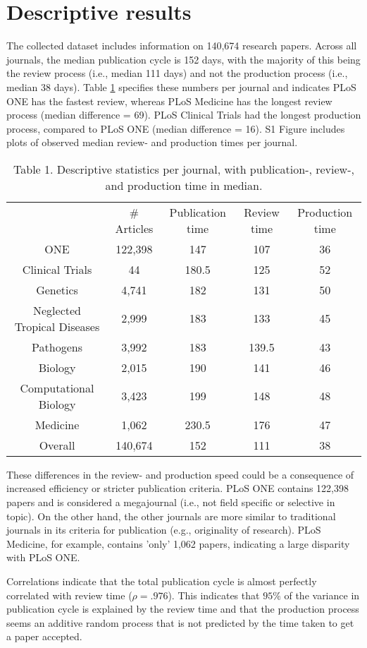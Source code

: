 \section*{Descriptive results}
The collected dataset includes information on 140,674 research papers. Across all journals, the median publication cycle is 152 days, with the majority of this being the review process (i.e., median 111 days) and not the production process (i.e., median 38 days). Table \ref{tab:tab1} specifies these numbers per journal and indicates PLoS ONE has the fastest review, whereas PLoS Medicine has the longest review process (median difference = 69). PLoS Clinical Trials had the longest production process, compared to PLoS ONE (median difference = 16). S1 Figure includes plots of observed median review- and production times per journal. 

\begin{table}
\caption{Table 1. Descriptive statistics per journal, with publication-, review-, and production time in median.}
\label{tab:tab1}
\begin{tabular}{ c c c c c }
          & \# Articles & Publication time & Review time & Production time \\
    ONE   & 122,398 & 147   & 107   & 36 \\
    Clinical Trials & 44    & 180.5 & 125   & 52 \\
    Genetics & 4,741  & 182   & 131   & 50 \\
    Neglected Tropical Diseases & 2,999  & 183   & 133   & 45 \\
    Pathogens & 3,992  & 183   & 139.5 & 43 \\
    Biology & 2,015  & 190   & 141   & 46 \\
    Computational Biology & 3,423  & 199   & 148   & 48 \\
    Medicine & 1,062  & 230.5   & 176   & 47 \\
    Overall & 140,674 & 152   & 111   & 38 \\
\end{tabular}
\end{table}

These differences in the review- and production speed could be a consequence of increased efficiency or stricter publication criteria. PLoS ONE contains 122,398 papers and is considered a megajournal (i.e., not field specific or selective in topic). On the other hand, the other journals are more similar to traditional journals in its criteria for publication (e.g., originality of research). PLoS Medicine, for example, contains 'only' 1,062 papers, indicating a large disparity with PLoS ONE. 

Correlations indicate that the total publication cycle is almost perfectly correlated with review time ($\rho=.976$). This indicates that $95\%$ of the variance in publication cycle is explained by the review time and that the production process seems an additive random process that is not predicted by the time taken to get a paper accepted.